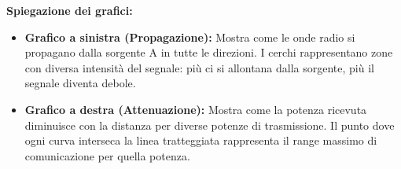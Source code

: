 \begin{center}
\end{center}

\vspace{0.3cm}
\textbf{Spiegazione dei grafici:}
\begin{itemize}
    \item \textbf{Grafico a sinistra (Propagazione):} Mostra come le onde radio si propagano dalla sorgente A in tutte le direzioni. I cerchi rappresentano zone con diversa intensità del segnale: più ci si allontana dalla sorgente, più il segnale diventa debole.
    
    \item \textbf{Grafico a destra (Attenuazione):} Mostra come la potenza ricevuta diminuisce con la distanza per diverse potenze di trasmissione. Il punto dove ogni curva interseca la linea tratteggiata rappresenta il range massimo di comunicazione per quella potenza.
\end{itemize}

